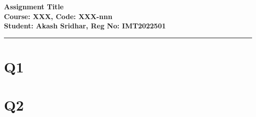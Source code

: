 \documentclass[10pt]{article}
\begin{document}
\begin{center}
    {\LARGE \textbf{Assignment Title}}\\
    \vspace{3.5pt}
    {\large \textbf{Course: XXX, Code: XXX-nnn}}\\
    \vspace{3.5pt}
    {\large \textbf{Student: Akash Sridhar, Reg No: IMT2022501}}\\
    
\end{center}
\hrule
\vspace{1cm}

\section*{Q1}
\lipsum[3-4]

\section*{Q2}
\lipsum[10-15]
\end{document}
